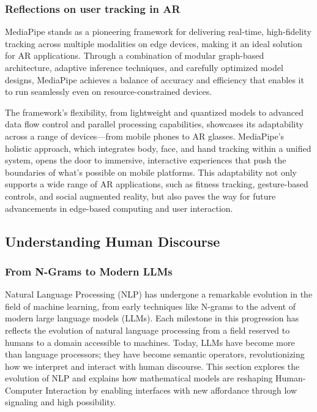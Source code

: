 \subsubsection{Reflections on user tracking in AR}

MediaPipe stands as a pioneering framework for delivering real-time, high-fidelity tracking across multiple modalities on edge devices, making it an ideal solution for AR applications.
Through a combination of modular graph-based architecture, adaptive inference techniques, and carefully optimized model designs, MediaPipe achieves a balance of accuracy and efficiency that enables it to run seamlessly even on resource-constrained devices.

The framework’s flexibility, from lightweight and quantized models to advanced data flow control and parallel processing capabilities, showcases its adaptability across a range of devices—from mobile phones to AR glasses.
MediaPipe’s holistic approach, which integrates body, face, and hand tracking within a unified system, opens the door to immersive, interactive experiences that push the boundaries of what’s possible on mobile platforms.
This adaptability not only supports a wide range of AR applications, such as fitness tracking, gesture-based controls, and social augmented reality, but also paves the way for future advancements in edge-based computing and user interaction.

\subsection{ Understanding Human Discourse}

\subsubsection{ From N-Grams to Modern LLMs}

Natural Language Processing (NLP) has undergone a remarkable evolution in the field of machine learning, from early techniques like N-grams \cite{Mar13} to the advent of modern large language models (LLMs).
Each milestone in this progression has reflects the evolution of natural language processing from a field reserved to humans to a domain accessible to machines.
Today, LLMs have become more than language processors; they have become semantic operators, revolutionizing how we interpret and interact with human discourse.
This section explores the evolution of NLP and explains how mathematical models are reshaping Human-Computer Interaction by enabling interfaces with new affordance through low signaling and high possibility.

